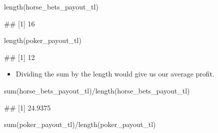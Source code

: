 \documentclass[
]{book}
\newenvironment{Shaded}{\begin{snugshade}}{\end{snugshade}}
\newcommand{\FunctionTok}[1]{\textcolor[rgb]{0.00,0.00,0.00}{#1}}
\newcommand{\NormalTok}[1]{#1}
\newcommand{\SpecialCharTok}[1]{\textcolor[rgb]{0.00,0.00,0.00}{#1}}
\providecommand{\tightlist}{%
  \setlength{\itemsep}{0pt}\setlength{\parskip}{0pt}}
\begin{document}
\begin{Shaded}
\begin{Highlighting}[]
\FunctionTok{length}\NormalTok{(horse\_bets\_payout\_tl)}
\end{Highlighting}
\end{Shaded}

\begin{Shaded}
\begin{Highlighting}[]
\NormalTok{\#\# [1] 16}
\end{Highlighting}
\end{Shaded}

\begin{Shaded}
\begin{Highlighting}[]
\FunctionTok{length}\NormalTok{(poker\_payout\_tl)}
\end{Highlighting}
\end{Shaded}

\begin{Shaded}
\begin{Highlighting}[]
\NormalTok{\#\# [1] 12}
\end{Highlighting}
\end{Shaded}

\begin{itemize}
\tightlist
\item
  Dividing the sum by the length would give us our average profit.
\end{itemize}

\begin{Shaded}
\begin{Highlighting}[]
\FunctionTok{sum}\NormalTok{(horse\_bets\_payout\_tl)}\SpecialCharTok{/}\FunctionTok{length}\NormalTok{(horse\_bets\_payout\_tl)}
\end{Highlighting}
\end{Shaded}

\begin{Shaded}
\begin{Highlighting}[]
\NormalTok{\#\# [1] 24.9375}
\end{Highlighting}
\end{Shaded}

\begin{Shaded}
\begin{Highlighting}[]
\FunctionTok{sum}\NormalTok{(poker\_payout\_tl)}\SpecialCharTok{/}\FunctionTok{length}\NormalTok{(poker\_payout\_tl)}
\end{Highlighting}
\end{Shaded}
\end{document}
